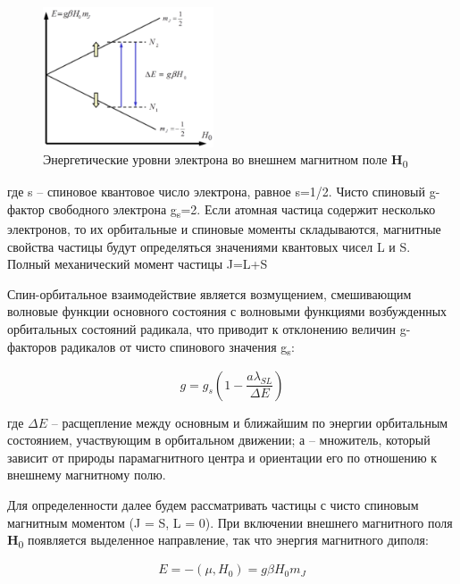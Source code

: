 \documentclass{article}
\begin{document}
\begin{figure}[h!]
	\begin{center}
		\includegraphics[width=0.45\textwidth]{pic1.png}
	\end{center}
	\caption{Энергетические уровни электрона во внешнем магнитном поле \textbf{H}\textsubscript{0}}
	\label{pic1}
\end{figure}

где s – спиновое квантовое число электрона, равное s=1/2. Чисто спиновый g-фактор свободного электрона g\textsubscript{s}=2. Если атомная частица содержит несколько электронов, то их орбитальные и спиновые моменты складываются, магнитные свойства частицы будут определяться значениями квантовых чисел L и S. Полный механический момент частицы J=L+S

Спин-орбитальное взаимодействие является возмущением, смешивающим волновые функции основного состояния с волновыми функциями возбужденных орбитальных состояний радикала, что приводит к отклонению величин g-факторов радикалов от чисто спинового значения g\textsubscript{s}:

\begin{equation}
g=g_{s} \left( 1-\frac{a \lambda _{SL}}{ \Delta E} \right)
\end{equation}

где $\Delta E$ – расщепление между основным и ближайшим по энергии орбитальным состоянием, участвующим в орбитальном движении; $а$ – множитель, который зависит от природы парамагнитного центра и ориентации его по отношению к внешнему магнитному полю.

Для определенности далее будем рассматривать частицы с чисто спиновым магнитным моментом (J = S, L = 0). При включении внешнего магнитного поля \textbf{H}\textsubscript{0} появляется выделенное направление, так что энергия магнитного диполя:

\begin{equation}
E = - (\mu , H_{0}) = g \beta H_{0}m_{J}
\end{equation}
\end{document}
